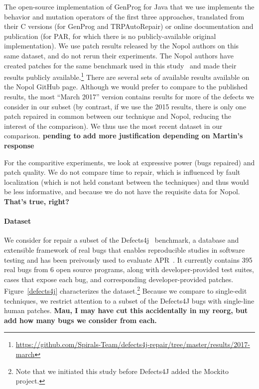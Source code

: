 \documentclass[conference]{IEEEtran}
\newcommand{\todo}[1]
  {{\scriptsize \textbf{\color{red} {#1}}}}
\begin{document}
The open-source implementation of GenProg for Java that we use implements 
the behavior and mutation operators of the first three approaches, translated
from their C versions (for GenProg and TRPAutoRepair) or online documentation
and publication (for PAR, for which there is no publicly-available original implementation).  We use patch results released
by the Nopol authors on this same dataset, and do not rerun their experiments.
The Nopol authors have created patches for the same benchmark used in
this study~\cite{martinez2016} and made their results publicly
available.\footnote{\url{https://github.com/Spirals-Team/defects4j-repair/tree/master/results/2017-march}}
There are several sets of available results available on the Nopol GitHub page.
Although we would prefer to compare to the published results, 
the most ``March 2017'' version contains results for more of the defects we
consider in our subset (by contrast, if we use the 2015 results, there is only
one patch repaired in common between our technique and Nopol, reducing the
interest of the comparison).  We thus use the most recent dataset in our comparison.
\todo{pending to add more justification depending on Martin's response} 

For the comparitive experiments, we look at expressive power (bugs repaired) and
patch quality.  We do not compare time to repair, which is influenced by fault
localization (which is not held constant between the techniques) and thus would
be less informative, and because we do not have the requisite data for
Nopol.\todo{That's true, right?}

\paragraph{Dataset}
We consider for repair a subset of the Defects4j~\cite{just14}
benchmark, a database and extensible 
framework of real bugs that enables reproducible studies in software testing and
has been preivously used to evaluate APR~\cite{Durieux15}. 
It currently contains 395 real bugs from 6
open source programs, along with developer-provided test suites, cases that
expose each bug,  and
corresponding developer-provided patches.  Figure~\ref{defects4j} characterizes
the dataset.\footnote{Note that we initiated this study before Defects4J added
  the Mockito project.} Because we compare to single-edit techniques, we
restrict attention to a subset of the Defects4J bugs with single-line human
patches. \todo{Mau, I may have cut this accidentally in my reorg, but add how
  many bugs we consider from each.}
\end{document}
